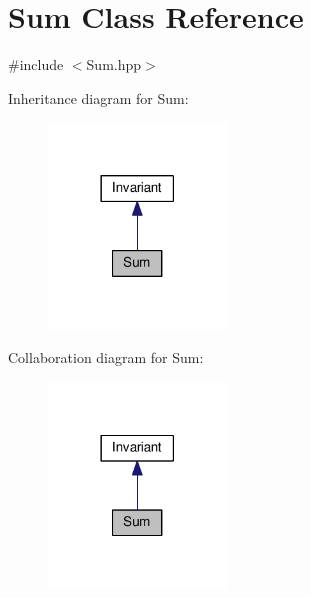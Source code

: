 \hypertarget{class_sum}{\section{Sum Class Reference}
\label{class_sum}
}


{\ttfamily \#include $<$Sum.\-hpp$>$}



Inheritance diagram for Sum\-:\nopagebreak
\begin{figure}[H]
\begin{center}
\leavevmode
\includegraphics[width=134pt]{class_sum__inherit__graph}
\end{center}
\end{figure}


Collaboration diagram for Sum\-:\nopagebreak
\begin{figure}[H]
\begin{center}
\leavevmode
\includegraphics[width=134pt]{class_sum__coll__graph}
\end{center}
\end{figure}
